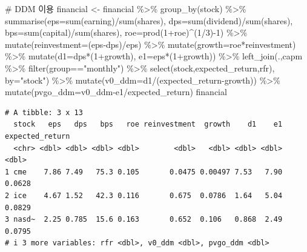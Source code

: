 \documentclass[
  a4paper,
  DIV=11,
  numbers=noendperiod]{scrreprt}
\newenvironment{Shaded}{\begin{snugshade}}{\end{snugshade}}
\newcommand{\AttributeTok}[1]{\textcolor[rgb]{0.40,0.45,0.13}{#1}}
\newcommand{\CommentTok}[1]{\textcolor[rgb]{0.37,0.37,0.37}{#1}}
\newcommand{\DecValTok}[1]{\textcolor[rgb]{0.68,0.00,0.00}{#1}}
\newcommand{\FunctionTok}[1]{\textcolor[rgb]{0.28,0.35,0.67}{#1}}
\newcommand{\NormalTok}[1]{\textcolor[rgb]{0.00,0.23,0.31}{#1}}
\newcommand{\OtherTok}[1]{\textcolor[rgb]{0.00,0.23,0.31}{#1}}
\newcommand{\SpecialCharTok}[1]{\textcolor[rgb]{0.37,0.37,0.37}{#1}}
\newcommand{\StringTok}[1]{\textcolor[rgb]{0.13,0.47,0.30}{#1}}
\begin{document}
\begin{Shaded}
\begin{Highlighting}[]
\CommentTok{\# DDM 이용}
\NormalTok{financial }\OtherTok{\textless{}{-}}\NormalTok{ financial }\SpecialCharTok{\%\textgreater{}\%} 
  \FunctionTok{group\_by}\NormalTok{(stock) }\SpecialCharTok{\%\textgreater{}\%} 
  \FunctionTok{summarise}\NormalTok{(}\AttributeTok{eps=}\FunctionTok{sum}\NormalTok{(earning)}\SpecialCharTok{/}\FunctionTok{sum}\NormalTok{(shares),}
            \AttributeTok{dps=}\FunctionTok{sum}\NormalTok{(dividend)}\SpecialCharTok{/}\FunctionTok{sum}\NormalTok{(shares),}
            \AttributeTok{bps=}\FunctionTok{sum}\NormalTok{(capital)}\SpecialCharTok{/}\FunctionTok{sum}\NormalTok{(shares),}
            \AttributeTok{roe=}\FunctionTok{prod}\NormalTok{(}\DecValTok{1}\SpecialCharTok{+}\NormalTok{roe)}\SpecialCharTok{\^{}}\NormalTok{(}\DecValTok{1}\SpecialCharTok{/}\DecValTok{3}\NormalTok{)}\SpecialCharTok{{-}}\DecValTok{1}\NormalTok{) }\SpecialCharTok{\%\textgreater{}\%} 
  \FunctionTok{mutate}\NormalTok{(}\AttributeTok{reinvestment=}\NormalTok{(eps}\SpecialCharTok{{-}}\NormalTok{dps)}\SpecialCharTok{/}\NormalTok{eps) }\SpecialCharTok{\%\textgreater{}\%} 
  \FunctionTok{mutate}\NormalTok{(}\AttributeTok{growth=}\NormalTok{roe}\SpecialCharTok{*}\NormalTok{reinvestment) }\SpecialCharTok{\%\textgreater{}\%} 
  \FunctionTok{mutate}\NormalTok{(}\AttributeTok{d1=}\NormalTok{dps}\SpecialCharTok{*}\NormalTok{(}\DecValTok{1}\SpecialCharTok{+}\NormalTok{growth),}
         \AttributeTok{e1=}\NormalTok{eps}\SpecialCharTok{*}\NormalTok{(}\DecValTok{1}\SpecialCharTok{+}\NormalTok{growth)) }\SpecialCharTok{\%\textgreater{}\%} 
  \FunctionTok{left\_join}\NormalTok{(.,capm }\SpecialCharTok{\%\textgreater{}\%} \FunctionTok{filter}\NormalTok{(group}\SpecialCharTok{==}\StringTok{"monthly"}\NormalTok{) }\SpecialCharTok{\%\textgreater{}\%} \FunctionTok{select}\NormalTok{(stock,expected\_return,rfr),}
            \AttributeTok{by=}\StringTok{"stock"}\NormalTok{) }\SpecialCharTok{\%\textgreater{}\%} 
  \FunctionTok{mutate}\NormalTok{(}\AttributeTok{v0\_ddm=}\NormalTok{d1}\SpecialCharTok{/}\NormalTok{(expected\_return}\SpecialCharTok{{-}}\NormalTok{growth)) }\SpecialCharTok{\%\textgreater{}\%} 
  \FunctionTok{mutate}\NormalTok{(}\AttributeTok{pvgo\_ddm=}\NormalTok{v0\_ddm}\SpecialCharTok{{-}}\NormalTok{e1}\SpecialCharTok{/}\NormalTok{expected\_return)}
\NormalTok{financial}
\end{Highlighting}
\end{Shaded}

\begin{verbatim}
# A tibble: 3 x 13
  stock   eps   dps   bps   roe reinvestment  growth    d1    e1 expected_return
  <chr> <dbl> <dbl> <dbl> <dbl>        <dbl>   <dbl> <dbl> <dbl>           <dbl>
1 cme    7.86 7.49   75.3 0.105       0.0475 0.00497 7.53   7.90          0.0628
2 ice    4.67 1.52   42.3 0.116       0.675  0.0786  1.64   5.04          0.0829
3 nasd~  2.25 0.785  15.6 0.163       0.652  0.106   0.868  2.49          0.0795
# i 3 more variables: rfr <dbl>, v0_ddm <dbl>, pvgo_ddm <dbl>
\end{verbatim}
\end{document}
